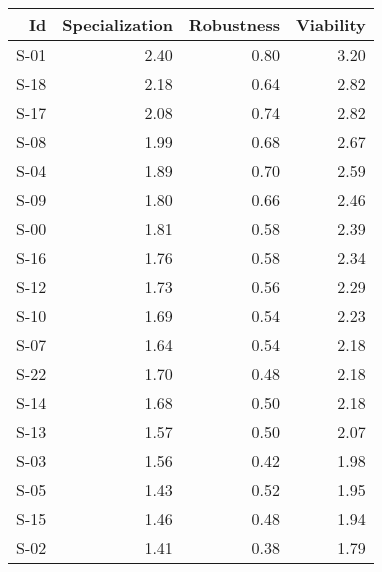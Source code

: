\begin{tabular}{ | r | r | r | r | }
    \hline
                    Id  &  Specialization  &      Robustness  &       Viability  \\
    \hline
    \hline
                  S-01  &            2.40  &            0.80  &            3.20  \\
    \hline
                  S-18  &            2.18  &            0.64  &            2.82  \\
    \hline
                  S-17  &            2.08  &            0.74  &            2.82  \\
    \hline
                  S-08  &            1.99  &            0.68  &            2.67  \\
    \hline
                  S-04  &            1.89  &            0.70  &            2.59  \\
    \hline
                  S-09  &            1.80  &            0.66  &            2.46  \\
    \hline
                  S-00  &            1.81  &            0.58  &            2.39  \\
    \hline
                  S-16  &            1.76  &            0.58  &            2.34  \\
    \hline
                  S-12  &            1.73  &            0.56  &            2.29  \\
    \hline
                  S-10  &            1.69  &            0.54  &            2.23  \\
    \hline
                  S-07  &            1.64  &            0.54  &            2.18  \\
    \hline
                  S-22  &            1.70  &            0.48  &            2.18  \\
    \hline
                  S-14  &            1.68  &            0.50  &            2.18  \\
    \hline
                  S-13  &            1.57  &            0.50  &            2.07  \\
    \hline
                  S-03  &            1.56  &            0.42  &            1.98  \\
    \hline
                  S-05  &            1.43  &            0.52  &            1.95  \\
    \hline
                  S-15  &            1.46  &            0.48  &            1.94  \\
    \hline
                  S-02  &            1.41  &            0.38  &            1.79  \\

\end{tabular}
